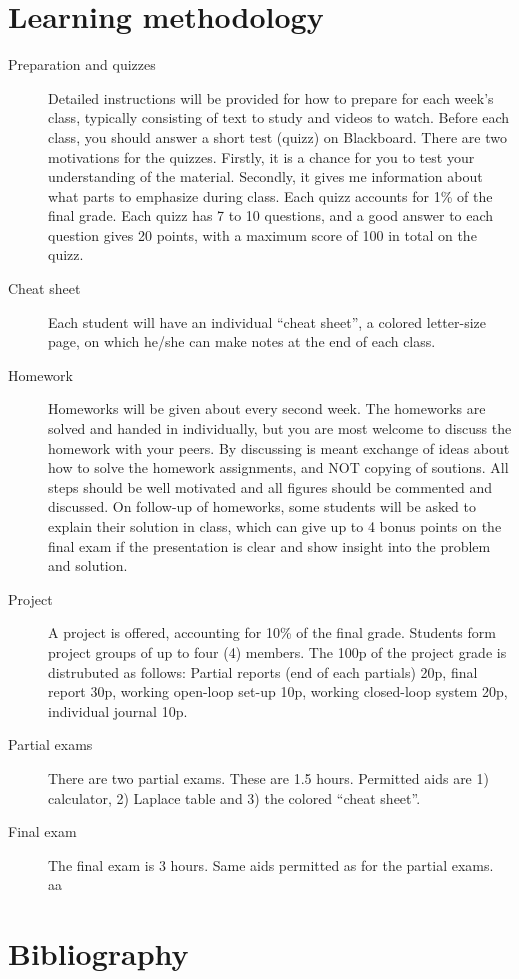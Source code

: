 \documentclass[letter, 10pt]{scrartcl}
\begin{document}
\section*{Learning methodology}
\begin{description}
\item[Preparation and quizzes] Detailed instructions will be provided for how to prepare for each week's class, typically consisting of text to study and videos to watch. Before each class, you should answer a short test (quizz) on Blackboard. There are two motivations for the quizzes. Firstly, it is a chance for you to test your understanding of the material. Secondly, it gives me information about what parts to emphasize during class. Each quizz accounts for 1\% of the final grade. Each quizz has 7 to 10 questions, and a good answer to each question gives 20 points, with a maximum score of 100 in total on the quizz.  
\item[Cheat sheet] Each student will have an individual ``cheat sheet'', a colored letter-size page, on which he/she can make notes at the end of each class.
\item[Homework] Homeworks will be given about every second week. The homeworks are solved and handed in individually, but you are most welcome to discuss the homework with your peers. By discussing is meant exchange of ideas about how to solve the homework assignments, and NOT copying of soutions. All steps should be well motivated and all figures should be commented and discussed. On follow-up of homeworks, some students will be asked to explain their solution in class, which can give up to 4 bonus points on the final exam if the presentation is clear and show insight into the problem and solution.
\item[Project] A project is offered, accounting for 10\% of the final grade. Students form project groups of up to four (4) members. The 100p of the project grade is distrubuted as follows: Partial reports (end of each partials) 20p, final report 30p, working open-loop set-up 10p, working closed-loop system 20p, individual journal 10p.  
\item[Partial exams] There are two partial exams. These are 1.5 hours. Permitted aids are 1) calculator, 2) Laplace table and 3) the colored ``cheat sheet''.
\item[Final exam] The final exam is 3 hours. Same aids permitted as for the partial exams.
aa\end{description}

\section*{Bibliography}
\end{document}
